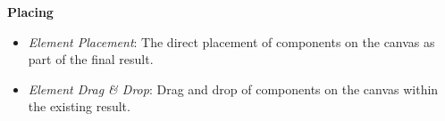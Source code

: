 \noindent\textbf{Placing}
\begin{itemize}
    \item \textit{Element Placement}: The direct placement of components on the canvas as part of the final result.
    \item \textit{Element Drag \& Drop}: Drag and drop of components on the canvas within the existing result.
\end{itemize}

